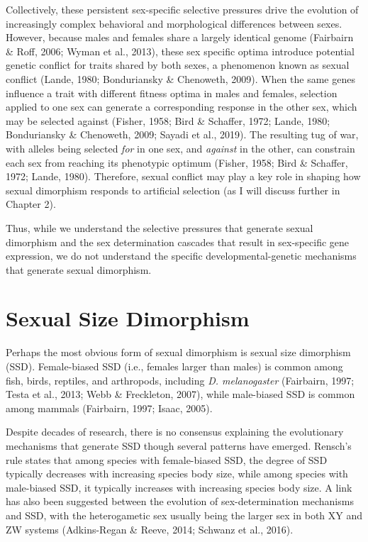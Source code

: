 \documentclass[12pt,reqno,oneside]{report}
\begin{document}
Collectively, these persistent sex-specific selective pressures drive the evolution of increasingly complex behavioral and morphological differences between sexes. However, because males and females share a largely identical genome (Fairbairn \& Roff, 2006; Wyman et al., 2013), these sex specific optima introduce potential genetic conflict for traits shared by both sexes, a phenomenon known as sexual conflict (Lande, 1980; Bonduriansky \& Chenoweth, 2009). When the same genes influence a trait with different fitness optima in males and females, selection applied to one sex can generate a corresponding response in the other sex, which may be selected against (Fisher, 1958; Bird \& Schaffer, 1972; Lande, 1980; Bonduriansky \& Chenoweth, 2009; Sayadi et al., 2019). The resulting tug of war, with alleles being selected \textit{for} in one sex, and \textit{against} in the other, can constrain each sex from reaching its phenotypic optimum (Fisher, 1958; Bird \& Schaffer, 1972; Lande, 1980). Therefore, sexual conflict may play a key role in shaping how sexual dimorphism responds to artificial selection (as I will discuss further in Chapter 2).

Thus, while we understand the selective pressures that generate sexual dimorphism and the sex determination cascades that result in sex-specific gene expression, we do not understand the specific developmental-genetic mechanisms that generate sexual dimorphism.

\section{Sexual Size Dimorphism}

Perhaps the most obvious form of sexual dimorphism is sexual size dimorphism (SSD). Female-biased SSD (i.e., females larger than males) is common among fish, birds, reptiles, and arthropods, including \textit{D. melanogaster} (Fairbairn, 1997; Testa et al., 2013; Webb \& Freckleton, 2007), while male-biased SSD is common among mammals (Fairbairn, 1997; Isaac, 2005). 

Despite decades of research, there is no consensus explaining the evolutionary mechanisms that generate SSD though several patterns have emerged. Rensch's rule states that among species with female-biased SSD, the degree of SSD typically decreases with increasing species body size, while among species with male-biased SSD, it typically increases with increasing species body size. A link has also been suggested between the evolution of sex-determination mechanisms and SSD, with the heterogametic sex usually being the larger sex in both XY and ZW systems (Adkins-Regan \& Reeve, 2014; Schwanz et al., 2016). 
\end{document}
